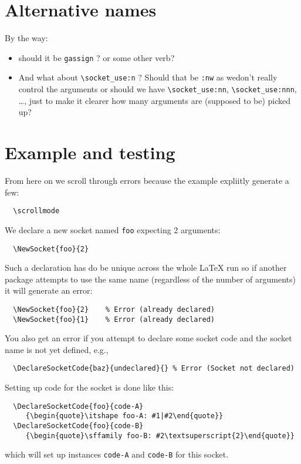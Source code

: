 \documentclass{article}
\newcommand\cs[1]{\texttt{\textbackslash #1}}
\begin{document}
\section{Alternative names}


By the way:
\begin{itemize}
\item
  should it be \texttt{gassign} ? or some other verb?
\item
  And what about \cs{socket\_use:n} ? Should that be \texttt{:nw}
  as wedon't really control the arguments or should we have
  \cs{socket\_use:nn}, \cs{socket\_use:nnn}, \ldots, just to make it
  clearer how many arguments are (supposed to be) picked up?
\end{itemize}




\section{Example and testing}

From here on we scroll through errors because the example expliitly generate a few:
\begin{verbatim}
  \scrollmode
\end{verbatim}
\scrollmode

We declare a new socket named \texttt{foo} expecting 2 arguments:
\begin{verbatim}
  \NewSocket{foo}{2}
\end{verbatim}

Such a declaration has do be unique across the whole \LaTeX{} run so
if another package attempts to use the same name (regardless of the
number of arguments) it will generate an error:
\begin{verbatim}
  \NewSocket{foo}{2}    % Error (already declared)
  \NewSocket{foo}{1}    % Error (already declared)
\end{verbatim}

You also get an error if you attempt to declare some socket code and the
socket name is not yet defined, e.g.,
\begin{verbatim}
  \DeclareSocketCode{baz}{undeclared}{} % Error (Socket not declared)
\end{verbatim}


Setting up code for the socket is done like this:
\begin{verbatim}
  \DeclareSocketCode{foo}{code-A}
     {\begin{quote}\itshape foo-A: #1|#2\end{quote}}
  \DeclareSocketCode{foo}{code-B}
     {\begin{quote}\sffamily foo-B: #2\textsuperscript{2}\end{quote}}
\end{verbatim}
which will set up instances \texttt{code-A} and \texttt{code-B} for
this socket.
\end{document}
